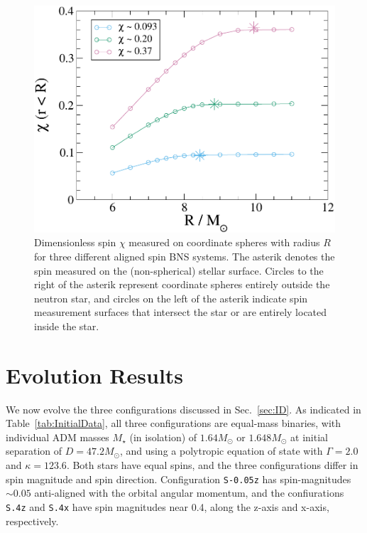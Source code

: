 {\begin{figure}
\includegraphics[width=0.95\columnwidth]{chap2/ChiVR}
\caption[Dimensionless spin measured as measured on different coordinate spheres.]{{\label{fig:ChiVR}}Dimensionless spin $\chi$ measured on
  coordinate spheres with radius $R$ for three different aligned spin
  BNS systems.  The asterik denotes the spin measured on the
  (non-spherical) stellar surface.  Circles to the right of the
  asterik represent coordinate spheres entirely outside the neutron
  star, and circles on the left of the asterik indicate spin
  measurement surfaces that intersect the star or are entirely located
  inside the star.}
\end{figure}



\section{Evolution Results}
\label{sec:EvolutionResults}

We now evolve the three configurations discussed in Sec.~\ref{sec:ID}.
As indicated in Table~\ref{tab:InitialData}, all three configurations
are equal-mass binaries, with individual ADM masses $M_\star$ (in
isolation) 
of $1.64M_{\odot}$ or $1.648M_{\odot}$ at initial separation of
$D=47.2M_\odot$, and using a polytropic equation of state with
$\Gamma=2.0$ and $\kappa=123.6$.  Both stars have equal spins, and the
three configurations differ in spin magnitude and spin direction.
Configuration {\tt S-0.05z} has spin-magnitudes $\sim 0.05$ anti-aligned
with the orbital angular momentum, and the confiurations {\tt S.4z} and {\tt S.4x}
have spin magnitudes near 0.4, along the z-axis and x-axis,
respectively.

}
